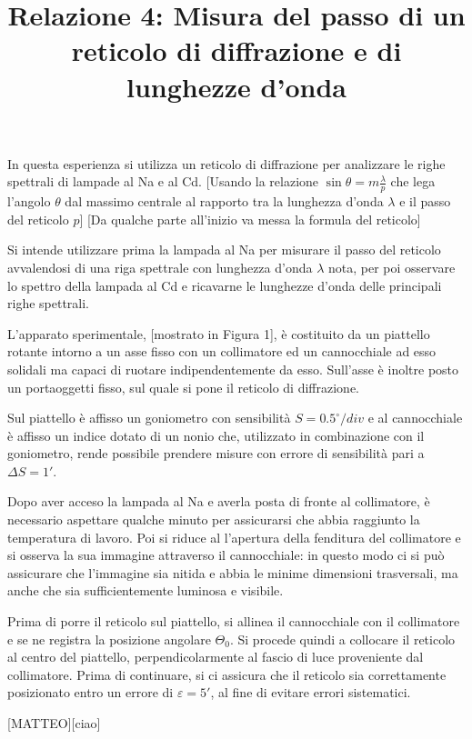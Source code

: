 \documentclass{article}
\title{Relazione 4: Misura del passo di un reticolo di diffrazione
	e di lunghezze d'onda}
\date{}
\begin{document}
	\maketitle
	
	
	In questa esperienza si utilizza un reticolo di diffrazione per analizzare le righe spettrali di lampade al Na e al Cd. [Usando la relazione $\sin{\theta}=m\frac{\lambda}{p}$ che lega l'angolo $\theta$ dal massimo centrale al rapporto tra la lunghezza d'onda $\lambda$ e il passo del reticolo $p$] [Da qualche parte all'inizio va messa la formula del reticolo]
	
	Si intende utilizzare prima la lampada al Na per misurare il passo del reticolo avvalendosi di una riga spettrale con lunghezza d'onda $\lambda$ nota, per poi osservare lo spettro della lampada al Cd e ricavarne le lunghezze d'onda delle principali righe spettrali.
	
	L'apparato sperimentale, [mostrato in Figura 1], è costituito da un piattello rotante intorno a un asse fisso con un collimatore ed un cannocchiale ad esso solidali ma capaci di ruotare indipendentemente da esso. Sull'asse è inoltre posto un portaoggetti fisso, sul quale si pone il reticolo di diffrazione.
	
	Sul piattello è affisso un goniometro con sensibilità $S=0.5^{\circ} / div$ e al cannocchiale è affisso un indice dotato di un nonio che, utilizzato in combinazione con il goniometro, rende possibile prendere misure con errore di sensibilità pari a $\Delta S = 1'$.

 Dopo aver acceso la lampada al Na e averla posta di fronte al collimatore, è necessario aspettare qualche minuto per assicurarsi che abbia raggiunto la temperatura di lavoro. Poi si riduce al l'apertura della fenditura del collimatore e si osserva la sua immagine attraverso il cannocchiale: in questo modo ci si può assicurare che l'immagine sia nitida e abbia le minime dimensioni trasversali, ma anche che sia sufficientemente luminosa e visibile.

Prima di porre il reticolo sul piattello, si allinea il cannocchiale con il collimatore e se ne registra la posizione angolare $\Theta_0$. Si procede quindi a collocare il reticolo al centro del piattello, perpendicolarmente al fascio di luce proveniente dal collimatore. Prima di continuare, si ci assicura che il reticolo sia correttamente posizionato entro un errore di $\varepsilon = 5'$, al fine di evitare errori sistematici.


	
 [MATTEO][ciao]
 
\end{document}
